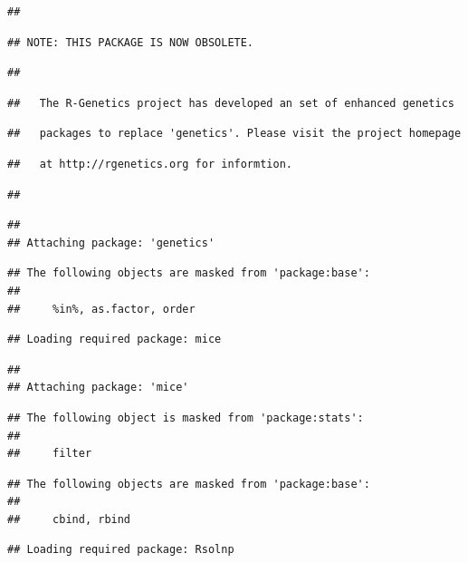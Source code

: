 \documentclass[
]{article}
\begin{document}
\begin{verbatim}
## 
\end{verbatim}

\begin{verbatim}
## NOTE: THIS PACKAGE IS NOW OBSOLETE.
\end{verbatim}

\begin{verbatim}
## 
\end{verbatim}

\begin{verbatim}
##   The R-Genetics project has developed an set of enhanced genetics
\end{verbatim}

\begin{verbatim}
##   packages to replace 'genetics'. Please visit the project homepage
\end{verbatim}

\begin{verbatim}
##   at http://rgenetics.org for informtion.
\end{verbatim}

\begin{verbatim}
## 
\end{verbatim}

\begin{verbatim}
## 
## Attaching package: 'genetics'
\end{verbatim}

\begin{verbatim}
## The following objects are masked from 'package:base':
## 
##     %in%, as.factor, order
\end{verbatim}

\begin{verbatim}
## Loading required package: mice
\end{verbatim}

\begin{verbatim}
## 
## Attaching package: 'mice'
\end{verbatim}

\begin{verbatim}
## The following object is masked from 'package:stats':
## 
##     filter
\end{verbatim}

\begin{verbatim}
## The following objects are masked from 'package:base':
## 
##     cbind, rbind
\end{verbatim}

\begin{verbatim}
## Loading required package: Rsolnp
\end{verbatim}
\end{document}
